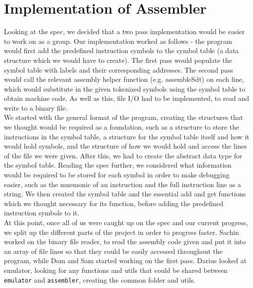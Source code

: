 \documentclass [10pt] {article}
\begin{document}
\section*{Implementation of Assembler}
Looking at the spec, we decided that a two pass implementation would be easier to work on as a group. Our implementation worked as follows - the program would first add the predefined instruction symbols to the symbol table (a data structure which we would have to create). The first pass would populate the symbol table with labels and their corresponding addresses. The second pass would call the relevant assembly helper function (e.g. assembleSdt) on each line, which would substitute in the given tokenized symbols using the symbol table to obtain machine code. As well as this, file I/O had to be implemented, to read and write to a binary file.
\vspace {0.3cm}
\\
We started with the general format of the program, creating the structures that we thought would be required as a foundation, such as a structure to store the instructions in the symbol table, a structure for the symbol table itself and how it would hold symbols, and the structure of how we would hold and access the lines of the file we were given. After this, we had to create the abstract data type for the symbol table. Reading the spec further, we considered what information would be required to be stored for each symbol in order to make debugging easier, such as the mnemonic of an instruction and the full instruction line as a string. We then created the symbol table and the essential add and get functions which we thought necessary for its function, before adding the predefined instruction symbols to it.
\vspace {0.3cm}
\\
At this point, once all of us were caught up on the spec and our current progress, we split up the different parts of the project in order to progress faster. Sachin worked on the binary file reader, to read the assembly code given and put it into an array of file lines so that they could be easily accessed throughout the program, while Dom and Sam started working on the first pass. Darius looked at emulator, looking for any functions and utils that could be shared between {\tt emulator} and {\tt assembler}, creating the common folder and utils.
\vspace {0.3cm}
\\
\end{document}
